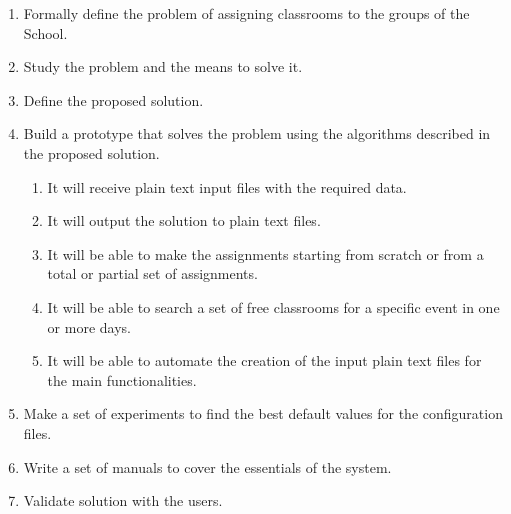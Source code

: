 \begin{enumerate}

    \item Formally define the problem of assigning classrooms to the groups of the School.

    \item Study the problem and the means to solve it.

    \item Define the proposed solution.

    \item Build a prototype that solves the problem using the algorithms described in the proposed solution.

        \begin{enumerate}

            \item It will receive plain text input files with the required data.

            \item It will output the solution to plain text files.

            \item It will be able to make the assignments starting from scratch or from a total or partial set of assignments.

            \item It will be able to search a set of free classrooms for a specific event in one or more days.

            \item It will be able to automate the creation of the input plain text files for the main functionalities.

        \end{enumerate}

    \item Make a set of experiments to find the best default values for the configuration files.

    \item Write a set of manuals to cover the essentials of the system.

    \item Validate solution with the users.

\end{enumerate}

